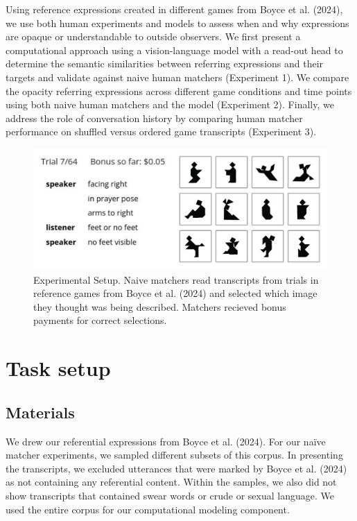 \documentclass[10pt, letterpaper]{article}
\begin{document}
Using reference expressions created in different games from Boyce et al.
(2024), we use both human experiments and models to assess when and why
expressions are opaque or understandable to outside observers. We first
present a computational approach using a vision-language model with a
read-out head to determine the semantic similarities between referring
expressions and their targets and validate against naive human matchers
(Experiment 1). We compare the opacity referring expressions across
different game conditions and time points using both naive human
matchers and the model (Experiment 2). Finally, we address the role of
conversation history by comparing human matcher performance on shuffled
versus ordered game transcripts (Experiment 3).

\begin{CodeChunk}
\begin{figure}[t!]

{\centering \includegraphics[width=1\linewidth]{matcher-diagram} 

}

\caption[Experimental Setup]{Experimental Setup. Naive matchers read transcripts from trials in reference games from Boyce et al. (2024) and selected which image they thought was being described. Matchers recieved bonus payments for correct selections. \label{game}}\label{fig:interface}
\end{figure}
\end{CodeChunk}

\section{Task setup}\label{task-setup}

\subsection{Materials}\label{materials}

We drew our referential expressions from Boyce et al. (2024). For our
naïve matcher experiments, we sampled different subsets of this corpus.
In presenting the transcripts, we excluded utterances that were marked
by Boyce et al. (2024) as not containing any referential content. Within
the samples, we also did not show transcripts that contained swear words
or crude or sexual language. We used the entire corpus for our
computational modeling component.
\end{document}
